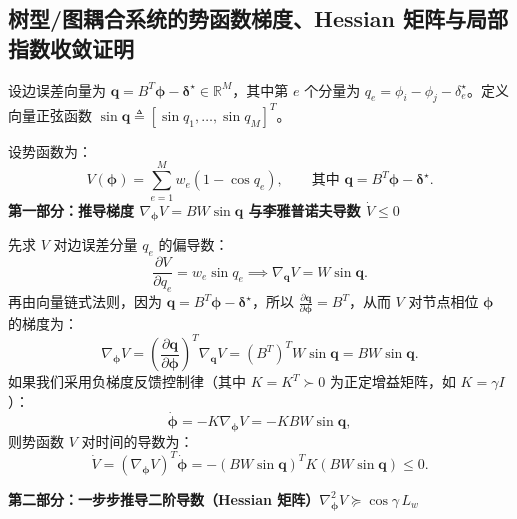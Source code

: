 \documentclass[UTF8, a4paper, 11pt]{ctexart}
\newcommand{\R}{\mathbb{R}}
\begin{document}
\subsection{树型/图耦合系统的势函数梯度、Hessian 矩阵与局部指数收敛证明}

设边误差向量为 $\bm{q} = B^T \bm{\phi} - \bm{\delta}^\star \in \R^M$，其中第 $e$ 个分量为 $q_e = \phi_i - \phi_j - \delta_e^\star$。定义向量正弦函数 $\sin\bm{q} \triangleq [\sin q_1, \dots, \sin q_M]^T$。

\begin{proofbox}
设势函数为：
\[
    V(\bm{\phi}) = \sum_{e=1}^M w_e (1 - \cos q_e), \qquad \text{其中 } \bm{q} = B^T \bm{\phi} - \bm{\delta}^\star.
\]
\textbf{第一部分：推导梯度 $\nabla_{\bm{\phi}} V = B W \sin\bm{q}$ 与李雅普诺夫导数 $\dot{V} \le 0$}

先求 $V$ 对边误差分量 $q_e$ 的偏导数：
\[
    \frac{\partial V}{\partial q_e} = w_e \sin q_e \implies \nabla_{\bm{q}} V = W \sin\bm{q}.
\]
再由向量链式法则，因为 $\bm{q} = B^T \bm{\phi} - \bm{\delta}^\star$，所以 $\frac{\partial \bm{q}}{\partial \bm{\phi}} = B^T$，从而 $V$ 对节点相位 $\bm{\phi}$ 的梯度为：
\[
    \nabla_{\bm{\phi}} V = \left(\frac{\partial \bm{q}}{\partial \bm{\phi}}\right)^T \nabla_{\bm{q}} V = (B^T)^T W \sin\bm{q} = B W \sin\bm{q}.
\]
如果我们采用负梯度反馈控制律（其中 $K = K^T \succ 0$ 为正定增益矩阵，如 $K = \gamma I$）：
\[
    \dot{\bm{\phi}} = -K \nabla_{\bm{\phi}} V = -K B W \sin\bm{q},
\]
则势函数 $V$ 对时间的导数为：
\[
    \dot{V} = (\nabla_{\bm{\phi}} V)^T \dot{\bm{\phi}} = -(B W \sin\bm{q})^T K (B W \sin\bm{q}) \le 0.
\]

\textbf{第二部分：一步步推导二阶导数（Hessian 矩阵）$\nabla_{\bm{\phi}}^2 V \succeq \cos\gamma\, L_w$}


\end{proofbox}
\end{document}
